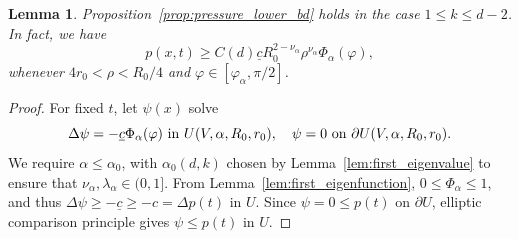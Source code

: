 \documentclass[11pt]{amsart}
\numberwithin{equation}{section}
\numberwithin{figure}{section}
\theoremstyle{plain}
\newtheorem{lem}[thm]{Lemma}
\theoremstyle{definition}
\theoremstyle{remark}
\theoremstyle{plain}
\begin{document}
\begin{lem}\label{lem:cone_subbarrier}
Proposition~\ref{prop:pressure_lower_bd} holds in the case $1\leq k \leq d-2$. In fact, we have
\[ p(x,t) \geq C(d)\underline{c}R_0^{2-\nu_\alpha}\rho^{\nu_\alpha}\Phi_\alpha(\varphi), \]
whenever $4r_0 < \rho < R_0/4$ and $\varphi\in [\varphi_\alpha, \pi/2]$.
\end{lem}
\begin{proof}
    

    For fixed $t$, let $\psi(x)$ solve
    \begin{equation}\label{subsolution} 
    \Delta \psi = -\underline{c}\Phi_\alpha(\varphi) \hbox{ in } U(V,\alpha, R_0, r_0), \quad         \psi = 0 \hbox{ on } \partial U(V,\alpha, R_0, r_0).
    \end{equation}
 We require $\alpha \leq \alpha_0$, with $\alpha_0(d,k)$ chosen by Lemma~\ref{lem:first_eigenvalue} to ensure that $\nu_\alpha, \lambda_\alpha\in (0, 1]$.   
    From Lemma~\ref{lem:first_eigenfunction}, $0 \leq \Phi_\alpha \leq 1$, and thus $\Delta \psi \geq -\underline{c} \geq -c = \Delta p(t)$ in $U$. Since $\psi = 0 \leq p(t)$ on $\partial U$, elliptic comparison principle gives $\psi \leq p(t)$ in $U$.
    

\end{proof}
\end{document}
